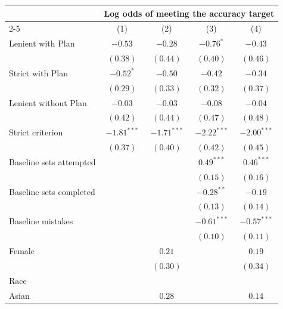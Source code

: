 \begin{tabular}{l c c c c}
\toprule
 & \multicolumn{4}{c}{Log odds of meeting the accuracy target} \\
\cmidrule(lr){2-5}
 & (1) & (2) & (3) & (4) \\
\midrule
Lenient with Plan        & $-0.53$       & $-0.28$       & $-0.76^{*}$   & $-0.43$       \\
                         & $(0.38)$      & $(0.44)$      & $(0.40)$      & $(0.46)$      \\
Strict with Plan         & $-0.52^{*}$   & $-0.50$       & $-0.42$       & $-0.34$       \\
                         & $(0.29)$      & $(0.33)$      & $(0.32)$      & $(0.37)$      \\
Lenient without Plan     & $-0.03$       & $-0.03$       & $-0.08$       & $-0.04$       \\
                         & $(0.42)$      & $(0.44)$      & $(0.47)$      & $(0.48)$      \\
Strict criterion         & $-1.81^{***}$ & $-1.71^{***}$ & $-2.22^{***}$ & $-2.00^{***}$ \\
                         & $(0.37)$      & $(0.40)$      & $(0.42)$      & $(0.45)$      \\
Baseline sets attempted  &               &               & $0.49^{***}$  & $0.46^{***}$  \\
                         &               &               & $(0.15)$      & $(0.16)$      \\
Baseline sets completed  &               &               & $-0.28^{**}$  & $-0.19$       \\
                         &               &               & $(0.13)$      & $(0.14)$      \\
Baseline mistakes        &               &               & $-0.61^{***}$ & $-0.57^{***}$ \\
                         &               &               & $(0.10)$      & $(0.11)$      \\
Female                   &               & $0.21$        &               & $0.19$        \\
                         &               & $(0.30)$      &               & $(0.34)$      \\
Race                     &               &               &               &               \\
\quad Asian              &               & $0.28$        &               & $0.14$        \\

\end{tabular}
